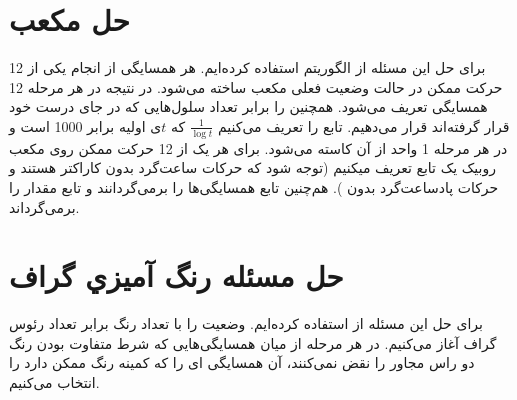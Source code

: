\documentclass{article}
\begin{document}


\newpage


\section{حل مکعب }
برای حل این مسئله از الگوریتم  استفاده کرده‌ایم. هر همسایگی از انجام یکی از 12 حرکت ممکن در حالت وضعیت فعلی مکعب ساخته می‌شود. در نتیجه در هر مرحله 12 همسایگی تعریف می‌شود. همچنین  را برابر تعداد سلول‌هایی که در جای درست خود قرار گرفته‌اند قرار می‌دهیم. تابع  را تعریف می‌کنیم
$
\frac{1}{\log t}
$
که $t$ی اولیه برابر 1000 است و در هر مرحله 1 واحد از آن کاسته می‌شود. برای هر یک از 12 حرکت ممکن روی مکعب روبیک یک تابع تعریف میکنیم (توجه شود که حرکات ساعت‌گرد بدون کاراکتر  هستند و حرکات پادساعت‌گرد بدون ). هم‌چنین تابع  همسایگی‌ها را برمی‌گردانند و تابع  مقدار  را برمی‌گرداند.


\section{حل مسئله رنگ آميزي گراف}
برای حل این مسئله از  استفاده کرده‌ایم. وضعیت  را با تعداد رنگ برابر تعداد رئوس گراف آغاز می‌کنیم. در هر مرحله از میان همسایگی‌هایی که شرط متفاوت بودن رنگ دو راس مجاور را نقض نمی‌کنند، آن همسایگی ‌ای را که کمینه رنگ ممکن دارد را انتخاب می‌کنیم.



\end{document}

